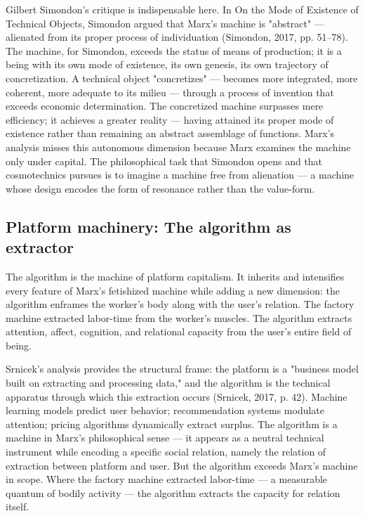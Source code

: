 Gilbert Simondon's critique is indispensable here. In On the Mode of Existence of Technical Objects, Simondon argued that Marx's machine is "abstract" — alienated from its proper process of individuation (Simondon, 2017, pp. 51–78). The machine, for Simondon, exceeds the status of means of production; it is a being with its own mode of existence, its own genesis, its own trajectory of concretization. A technical object "concretizes" — becomes more integrated, more coherent, more adequate to its milieu — through a process of invention that exceeds economic determination. The concretized machine surpasses mere efficiency; it achieves a greater reality — having attained its proper mode of existence rather than remaining an abstract assemblage of functions. Marx's analysis misses this autonomous dimension because Marx examines the machine only under capital. The philosophical task that Simondon opens and that cosmotechnics pursues is to imagine a machine free from alienation — a machine whose design encodes the form of resonance rather than the value-form.

\subsection{Platform machinery: The algorithm as extractor}

The algorithm is the machine of platform capitalism. It inherits and intensifies every feature of Marx's fetishized machine while adding a new dimension: the algorithm enframes the worker's body along with the user's relation. The factory machine extracted labor-time from the worker's muscles. The algorithm extracts attention, affect, cognition, and relational capacity from the user's entire field of being.

Srnicek's analysis provides the structural frame: the platform is a "business model built on extracting and processing data," and the algorithm is the technical apparatus through which this extraction occurs (Srnicek, 2017, p. 42). Machine learning models predict user behavior; recommendation systems modulate attention; pricing algorithms dynamically extract surplus. The algorithm is a machine in Marx's philosophical sense — it appears as a neutral technical instrument while encoding a specific social relation, namely the relation of extraction between platform and user. But the algorithm exceeds Marx's machine in scope. Where the factory machine extracted labor-time — a measurable quantum of bodily activity — the algorithm extracts the capacity for relation itself.

